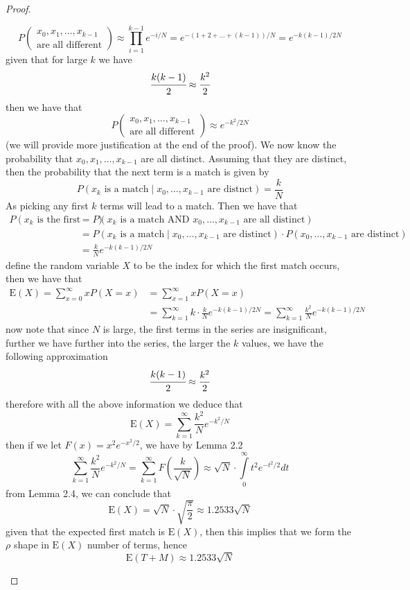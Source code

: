 \documentclass[a4 paper]{article}
\newcommand{\?}{\stackrel{?}{=}}
\begin{document}
\begin{tcolorbox}[breakable,colback=blue!5!white, colframe=blue!50!black]
\begin{proof}
\begin{enumerate}
$$ P\left( \substack{x_0 , x_1 , \dots, x_{k-1} \\ \text{are all different}}\right) \approx \prod\limits_{i = 1}^{k-1}e^{- i / N} = e^{- (1  + 2 + \dots + (k-1)) /N}  = e^{- k(k-1)/2N} $$
given that for large $ k $ we have 
$$ \cfrac{k(k-1)}{2} \approx \cfrac{k^2 }{2}   $$
then we have that 
$$ P\left( \substack{x_0 , x_1 , \dots, x_{k-1} \\ \text{are all different}}\right) \approx e^{-k^2 / 2N} $$
(we will provide more justification at the end of the proof). We now know the probability that $ x_0 , x_1 ,\dots, x_{k-1} $ are all distinct. Assuming that they are distinct, then the probability that the next term is a match is given by
$$ P(x_k \text{ is a match} \mid x_0 ,\dots,x_{k-1} \text{ are distnct}) = \frac{k}{N} $$
As picking any first $ k $ terms will lead to a match. Then we have that 
\begin{align*}
    P(x_k \text{ is the first match}) & = P(x_k \text{ is a match AND }x_0 ,\dots,x_{k-1} \text{ are all distinct} ) \\ 
        & = P(x_k \text{ is a match} \mid x_0 , \dots, x_{k-1} \text{ are distinct} ) \cdot P(x_0 ,\dots, x_{k-1} \text{ are distinct}) \\ 
        & =  \frac{k}{N} e^{- k(k-1)/2N}
\end{align*}
define the random variable $ X $ to be the index for which the first match occurs, then we have that 
\begin{align*}
    \text{E}(X) = \sum\limits_{x  =0}^{\infty} x P (X=x) & = \sum\limits_{x =1}^{\infty} xP(X=x) \\ 
    & = \sum\limits_{k  =1}^{\infty} k \cdot \frac{k}{N} e^{ - k (k-1) / 2N} = \sum\limits_{k =1 }^{\infty} \frac{k^2}{N} e^{- k (k-1) / 2N}
\end{align*}
now note that since $ N $ is large, the first terms in the series are insignificant, further we have further into the series, the larger the $ k $ values, we have the following approximation 
$$  \cfrac{k(k-1)}{2} \approx \frac{k^2}{2}  $$
therefore with all the above information we deduce that 
$$ \text{E}(X) = \sum\limits_{k =1 }^{\infty} \frac{k^2}{N} e^{- k^2 / N} $$
then if we let $ F(x) = x^2 e^{ - x^2 /2} $, we have by Lemma 2.2
$$ \sum\limits_{k =1 }^{\infty}  \frac{k^2}{N} e^{-k^2 / N}  = \sum\limits_{k =1 }^{\infty} F\left(\frac{k}{\sqrt{N}}\right) \approx \sqrt{N}\cdot \int\limits_{0}^{\infty} t^2 e^{-t^2/ 2} dt $$
from Lemma 2.4, we can conclude that 
$$ \text{E}(X) = \sqrt{N} \cdot \sqrt{\frac{\pi}{2}} \approx 1.2533 \sqrt{N} $$
given that the expected first match is $ \text{E}(X) $, then this implies that we form the $ \rho $ shape in $ \text{E}(X) $ number of terms, hence 
$$ \text{E}(T+M) \approx 1.2533 \sqrt{N} $$

\end{enumerate}
\end{proof}
\end{tcolorbox}
\end{document}
